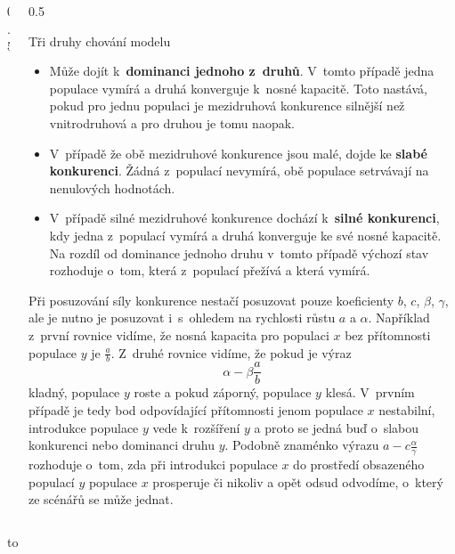 \documentclass[handouts]{beamer}
\begin{document}
\begin{frame}
\begin{columns}
\begin{column}{0.5\hsize}
\end{column}
\begin{column}{0.5\hsize}
\begin{block}{Tři druhy chování modelu}
\begin{itemize}
\item Může dojít k \textbf{dominanci jednoho z druhů}. V tomto případě jedna
  populace vymírá a druhá konverguje k nosné kapacitě. Toto nastává,
  pokud pro jednu populaci je mezidruhová konkurence silnější než
  vnitrodruhová a pro druhou je tomu naopak.
\item V případě že obě mezidruhové konkurence jsou malé, dojde ke
  \textbf{slabé konkurenci}. Žádná z populací nevymírá, obě populace setrvávají
  na nenulových hodnotách.
\item V případě silné mezidruhové konkurence dochází k \textbf{silné
  konkurenci}, kdy jedna z populací vymírá a druhá konverguje ke své
  nosné kapacitě. Na rozdíl od dominance jednoho druhu v tomto případě
  výchozí stav rozhoduje o tom, která z populací přežívá a která
  vymírá.
\end{itemize}
\end{block}
Při posuzování síly konkurence nestačí posuzovat pouze koeficienty
$b$, $c$, $\beta$, $\gamma$, ale je nutno je posuzovat i s ohledem na
rychlosti růstu $a$ a $\alpha$. Například z první rovnice vidíme, že
nosná kapacita pro populaci $x$ bez přítomnosti populace $y$ je
$\frac ab$. Z druhé rovnice vidíme, že pokud je výraz
$$\alpha - \beta \frac ab$$ kladný, populace $y$ roste a pokud záporný,
populace $y$ klesá. V prvním případě je tedy bod odpovídající
přítomnosti jenom populace $x$ nestabilní, introdukce populace $y$
vede k rozšíření $y$ a proto se jedná buď o slabou konkurenci nebo
dominanci druhu $y$. Podobně znaménko výrazu $a-c\frac\alpha\gamma$
rozhoduje o tom, zda při introdukci populace $x$ do prostředí
obsazeného populací $y$ populace $x$ prosperuje či nikoliv a opět
odsud odvodíme, o který ze scénářů se může jednat.
\end{column}
\end{columns}


\hbox to 
\end{frame}
\end{document}
